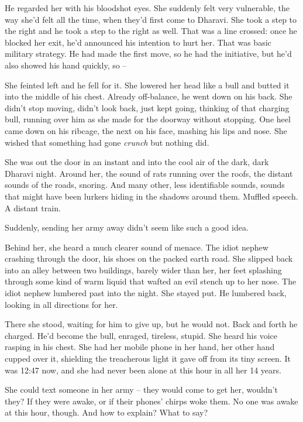 He regarded her with his bloodshot eyes. She suddenly felt very
vulnerable, the way she'd felt all the time, when they'd first come
to Dharavi. She took a step to the right and he took a step to the
right as well. That was a line crossed: once he blocked her exit,
he'd announced his intention to hurt her. That was basic military
strategy. He had made the first move, so he had the initiative, but
he'd also showed his hand quickly, so --

She feinted left and he fell for it. She lowered her head like a
bull and butted it into the middle of his chest. Already
off-balance, he went down on his back. She didn't stop moving,
didn't look back, just kept going, thinking of that charging bull,
running over him as she made for the doorway without stopping. One
heel came down on his ribcage, the next on his face, mashing his
lips and nose. She wished that something had gone \emph{crunch} but
nothing did.

She was out the door in an instant and into the cool air of the
dark, dark Dharavi night. Around her, the sound of rats running
over the roofs, the distant sounds of the roads, snoring. And many
other, less identifiable sounds, sounds that might have been
lurkers hiding in the shadows around them. Muffled speech. A
distant train.

Suddenly, sending her army away didn't seem like such a good idea.

Behind her, she heard a much clearer sound of menace. The idiot
nephew crashing through the door, his shoes on the packed earth
road. She slipped back into an alley between two buildings, barely
wider than her, her feet splashing through some kind of warm liquid
that wafted an evil stench up to her nose. The idiot nephew
lumbered past into the night. She stayed put. He lumbered back,
looking in all directions for her.

There she stood, waiting for him to give up, but he would not. Back
and forth he charged. He'd become the bull, enraged, tireless,
stupid. She heard his voice rasping in his chest. She had her
mobile phone in her hand, her other hand cupped over it, shielding
the treacherous light it gave off from its tiny screen. It was
12:47 now, and she had never been alone at this hour in all her 14
years.

She could text someone in her army -- they would come to get her,
wouldn't they? If they were awake, or if their phones' chirps woke
them. No one was awake at this hour, though. And how to explain?
What to say?

